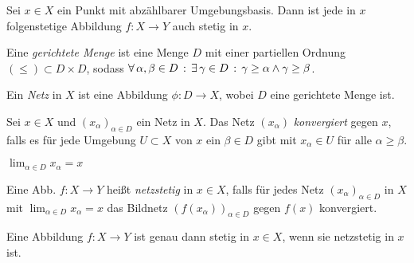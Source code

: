 \documentclass{cheat-sheet}
\newcommand{\Pow}{\mathcal{P}} %
\begin{document}
\begin{prop}
  Sei $x \in X$ ein Punkt mit abzählbarer Umgebungsbasis. Dann ist jede in $x$ folgenstetige Abbildung $f : X \to Y$ auch stetig in $x$.
\end{prop}

\begin{defn}
  Eine \emph{gerichtete Menge} ist eine Menge $D$ mit einer partiellen Ordnung $(\le) \subset D \times D$, sodass
  $\forall \, {\alpha, \beta \in D} \,:\, \exists \, {\gamma \in D} \,:\, \gamma \geq \alpha \wedge \gamma \geq \beta$.
\end{defn}

\begin{defn}
  Ein \emph{Netz} in $X$ ist eine Abbildung $\phi : D \to X$, wobei $D$ eine gerichtete Menge ist.
\end{defn}

\iffalse
\begin{bspe}
  \begin{itemize}
    \item $D = (\N, \leq)$
    \item $X$ beliebige Menge, $D = (\Pow(X), \subseteq)$ oder $D = (\Pow(X), \supseteq)$
    \item Sei $(X, \tau)$ ein top. Raum, $x \in X$, $D \coloneqq (\Set{U \subset X}{\text{$U$ Umgebung von $x$}}, \leq)$ mit $U \leq V \coloneqq V \subset U$.
  \end{itemize}
\end{bspe}
\fi

\begin{defn}
  Sei $x \in X$ und $(x_\alpha)_{\alpha \in D}$ ein Netz in $X$. Das Netz $(x_\alpha)$ \emph{konvergiert} gegen $x$, falls es für jede Umgebung $U \subset X$ von $x$ ein $\beta \in D$ gibt mit $x_\alpha \in U$ für alle $\alpha \geq \beta$.
\end{defn}

\begin{nota}
  $\lim_{\alpha \in D} x_\alpha = x$
\end{nota}

\begin{defn}
  Eine Abb. $f : X \to Y$ heißt \emph{netzstetig} in $x \in X$, falls für jedes Netz $(x_\alpha)_{\alpha \in D}$ in $X$ mit $\lim_{\alpha \in D} x_\alpha = x$ das Bildnetz $(f(x_\alpha))_{\alpha \in D}$ gegen $f(x)$ konvergiert.
\end{defn}

\begin{prop}
  Eine Abbildung $f : X \to Y$ ist genau dann stetig in $x \in X$, wenn sie netzstetig in $x$ ist.
\end{prop}
\end{document}
